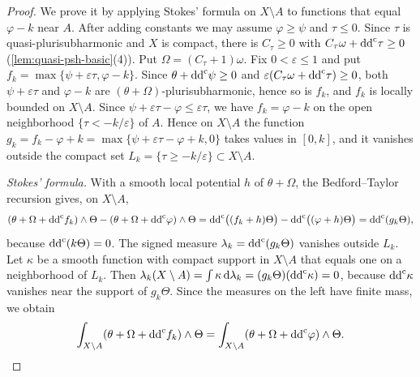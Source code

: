 \begin{proof}
We prove it by applying Stokes' formula on $X\setminus A$ to functions that equal $\varphi-k$ near $A$. After adding constants we may assume $\varphi\geq\psi$ and $\tau\leq0$. Since $\tau$ is quasi-plurisubharmonic and $X$ is compact, there is $C_\tau\geq0$ with $C_\tau\omega+\mathrm{dd}^{\mathrm{c}}\tau\geq0$ (\cref{lem:quasi-psh-basic}(4)). Put $\Omega=(C_\tau+1)\omega$. Fix $0<\varepsilon\leq1$ and put $f_k=\max\{\psi+\varepsilon\tau,\varphi-k\}$. Since $\theta+\mathrm{dd}^{\mathrm{c}}\psi\geq0$ and $\varepsilon(C_\tau\omega+\mathrm{dd}^{\mathrm{c}}\tau)\geq0$, both $\psi+\varepsilon\tau$ and $\varphi-k$ are $(\theta+\Omega)$-plurisubharmonic, hence so is $f_k$, and $f_k$ is locally bounded on $X\setminus A$. Since $\psi+\varepsilon\tau-\varphi\leq\varepsilon\tau$, we have $f_k=\varphi-k$ on the open neighborhood $\{\tau<-k/\varepsilon\}$ of $A$. Hence on $X\setminus A$ the function $g_k=f_k-\varphi+k=\max\{\psi+\varepsilon\tau-\varphi+k,0\}$ takes values in $[0,k]$, and it vanishes outside the compact set $L_k=\{\tau\geq-k/\varepsilon\}\subset X\setminus A$.

\emph{Stokes' formula.} With a smooth local potential $h$ of $\theta+\Omega$, the Bedford--Taylor recursion gives, on $X\setminus A$,
\[
 (\theta+\Omega+\mathrm{dd}^{\mathrm{c}} f_k)\wedge\Theta-(\theta+\Omega+\mathrm{dd}^{\mathrm{c}}\varphi)\wedge\Theta=\mathrm{dd}^{\mathrm{c}}\bigl((f_k+h)\Theta\bigr)-\mathrm{dd}^{\mathrm{c}}\bigl((\varphi+h)\Theta\bigr)=\mathrm{dd}^{\mathrm{c}}(g_k\Theta),
\]
because $\mathrm{dd}^{\mathrm{c}}(k\Theta)=0$. The signed measure $\lambda_k=\mathrm{dd}^{\mathrm{c}}(g_k\Theta)$ vanishes outside $L_k$. Let $\kappa$ be a smooth function with compact support in $X\setminus A$ that equals one on a neighborhood of $L_k$. Then $\lambda_k(X\setminus A)=\int\kappa\,\mathrm d\lambda_k=(g_k\Theta)(\mathrm{dd}^{\mathrm{c}}\kappa)=0$, because $\mathrm{dd}^{\mathrm{c}}\kappa$ vanishes near the support of $g_k\Theta$. Since the measures on the left have finite mass, we obtain
\[
 \int_{X\setminus A}(\theta+\Omega+\mathrm{dd}^{\mathrm{c}} f_k)\wedge\Theta=\int_{X\setminus A}(\theta+\Omega+\mathrm{dd}^{\mathrm{c}}\varphi)\wedge\Theta.
\]


\end{proof}
